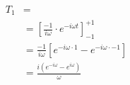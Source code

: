 \documentclass[preview]{standalone}
\begin{document}
\begin{align*}
T_{1}&= \\  &=[\frac{-1}{i\omega}\cdot e^{-i\omega t}]_{-1}^{+1} \\ &=\frac{-1}{i\omega}[e^{-i\omega\cdot 1}-e^{-i\omega\cdot -1}] \\  &=\frac{i(e^{-i\omega}-e^{i\omega})}{\omega}
\end{align*}
\end{document}
